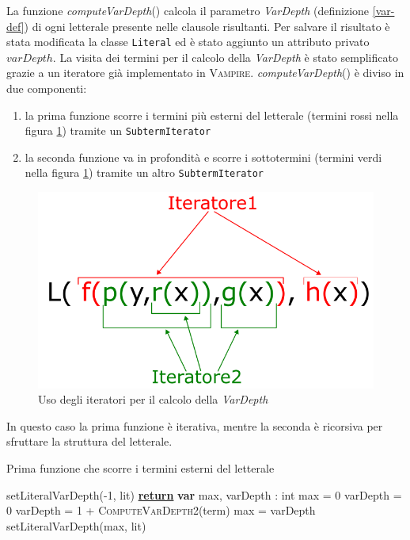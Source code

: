 La funzione \emph{computeVarDepth}() calcola il parametro \emph{VarDepth} (definizione \ref{var-def}) di ogni letterale 
presente nelle clausole risultanti. Per salvare il risultato è stata modificata la classe \verb|Literal| ed è stato aggiunto un attributo 
privato \emph{$varDepth$}. 
La visita dei termini per il calcolo della \emph{VarDepth} è stato semplificato grazie a un iteratore 
già implementato in \textsc{Vampire}. \emph{computeVarDepth}() è diviso in due componenti:
\begin{enumerate}
    \item la prima funzione scorre i termini più esterni del letterale (termini rossi nella figura \ref{fig:lit-it}) tramite un \verb|SubtermIterator|
    \item la seconda funzione va in profondità e scorre i sottotermini (termini verdi nella figura \ref{fig:lit-it}) tramite un altro \verb|SubtermIterator|
\end{enumerate}
\begin{figure}[H]
    \centering
    \includegraphics[width=\columnwidth]{figures/literal-iterator.png}
    \caption{Uso degli iteratori per il calcolo della \emph{VarDepth}}
    \label{fig:lit-it}
\end{figure}
In questo caso la prima funzione è iterativa, mentre la seconda è ricorsiva per sfruttare la struttura del letterale.
\begin{algorithm}[H]
    \caption{Prima funzione che scorre i termini esterni del letterale}
    \begin{algorithmic}
            \State setLiteralVarDepth(-1, lit)
            \State \underline{\textbf{return}}
        \EndIf
        \State \textbf{var} max, varDepth : int
        \State max = 0
         
            \State varDepth = 0
            \State varDepth = 1 + \textsc{ComputeVarDepth2}(term)
                \State max = varDepth
            \EndIf
        \EndFor
        \State setLiteralVarDepth(max, lit)
        \EndFunction
    \end{algorithmic}
\end{algorithm}
